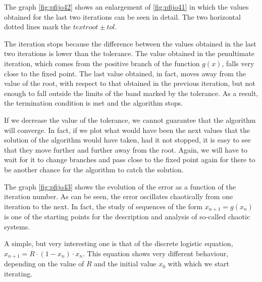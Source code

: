 \begin{paracol}{2}
\switchcolumn

The graph \ref{fig:pfijo42} shows an enlargement of \ref{fig:pfijo41} in which the values obtained for the last two iterations can be seen in detail. The two horizontal dotted lines mark the $text{root}\pm tol$. 

 The iteration stops because the difference between the values obtained in the last two iterations is lower than the tolerance. The value obtained in the penultimate iteration, which comes from the positive branch of the function $g(x)$, falls very close to the fixed point. The last value obtained, in fact, moves away from the value of the root, with respect to that obtained in the previous iteration, but not enough to fall outside the limits of the band marked by the tolerance. As a result, the termination condition is met and the algorithm stops. 

 If we decrease the value of the tolerance, we cannot guarantee that the algorithm will converge. In fact, if we plot what would have been the next values that the solution of the algorithm would have taken, had it not stopped, it is easy to see that they move further and further away from the root. Again, we will have to wait for it to change branches and pass close to the fixed point again for there to be another chance for the algorithm to catch the solution.
 
The graph \ref{fig:pfijo43} shows the evolution of the error as a function of the iteration number. As can be seen, the error oscillates chaotically from one iteration to the next. In fact, the study of sequences of the form $x_{n+1}=g(x_n)$ is one of the starting points for the description and analysis of so-called chaotic systems. 

A simple, but very interesting one is that of the discrete logistic equation, $x_{n+1}=R\cdot (1-x_n)\cdot x_n$. This equation shows very different behaviour, depending on the value of $R$ and the initial value $x_0$ with which we start iterating.
\end{paracol} 

